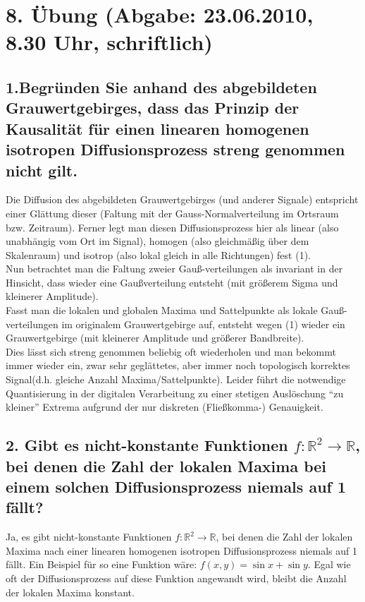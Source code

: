 \section*{8. \"Ubung (Abgabe: 23.06.2010, 8.30 Uhr, schriftlich)}

\subsection*{1.Begr\"unden Sie anhand des abgebildeten Grauwertgebirges, dass das Prinzip der Kausalit\"at f\"ur einen linearen homogenen isotropen Diffusionsprozess streng genommen nicht gilt.}

Die Diffusion des abgebildeten Grauwertgebirges (und anderer Signale) entspricht einer Gl\"attung dieser (Faltung mit der Gauss-Normalverteilung im Ortsraum bzw. Zeitraum). Ferner legt man diesen Diffusionsprozess hier als linear (also unabh\"angig vom Ort im Signal), homogen (also gleichm\"a{\ss}ig \"uber dem Skalenraum) und isotrop (also lokal gleich in alle Richtungen) fest (1). \\
Nun betrachtet man die Faltung zweier Gau{\ss}-verteilungen als invariant in der Hinsicht, dass wieder eine Gau{\ss}verteilung entsteht (mit gr\"o{\ss}erem Sigma und kleinerer Amplitude). \\
Fasst man die lokalen und globalen Maxima und Sattelpunkte als lokale Gau{\ss}-verteilungen im originalem Grauwertgebirge auf, entsteht wegen (1) wieder ein Grauwertgebirge (mit kleinerer Amplitude und gr\"o{\ss}erer Bandbreite). \\
Dies l\"asst sich streng genommen beliebig oft wiederholen und man bekommt immer wieder ein, zwar sehr gegl\"attetes, aber immer noch topologisch korrektes  Signal(d.h. gleiche Anzahl Maxima/Sattelpunkte). Leider f\"uhrt die notwendige Quantisierung in der digitalen Verarbeitung zu einer stetigen Ausl\"oschung ``zu kleiner'' Extrema aufgrund der nur diskreten (Flie{\ss}komma-) Genauigkeit.

\subsection*{2. Gibt es nicht-konstante Funktionen $f: \mathbb{R}^{2} \rightarrow \mathbb{R}$, bei denen die Zahl der lokalen Maxima bei einem solchen Diffusionsprozess niemals auf 1 f\"allt?}
Ja, es gibt nicht-konstante Funktionen $f: \mathbb{R}^{2} \rightarrow \mathbb{R}$, bei denen die Zahl der lokalen Maxima nach einer linearen homogenen isotropen Diffusionsprozess niemals auf 1 f\"allt. Ein Beispiel f\"ur so eine Funktion w\"are: $f(x,y) = \sin{x}+\sin{y}$. Egal wie oft der Diffusionsprozess auf diese Funktion angewandt wird, bleibt die Anzahl der lokalen Maxima konstant. 
